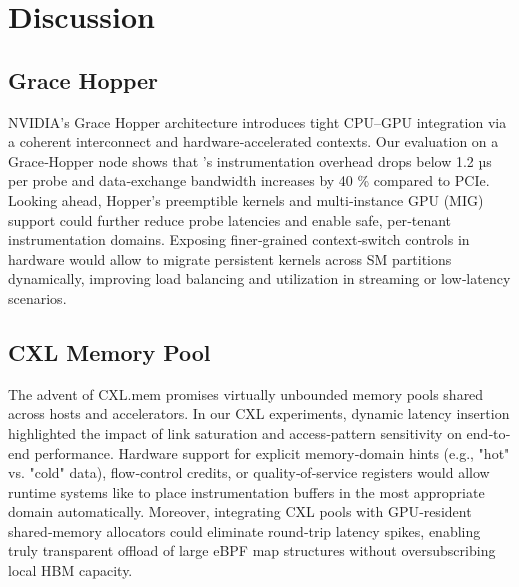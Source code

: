 \section{Discussion}\label{sec:suggestion}

\subsection{Grace Hopper}
NVIDIA's Grace Hopper architecture introduces tight CPU–GPU integration via a coherent interconnect and hardware‐accelerated contexts. Our evaluation on a Grace‐Hopper node shows that \sys{}'s instrumentation overhead drops below 1.2 µs per probe and data‐exchange bandwidth increases by 40 \% compared to PCIe. Looking ahead, Hopper's preemptible kernels and multi‐instance GPU (MIG) support could further reduce probe latencies and enable safe, per‐tenant instrumentation domains. Exposing finer‐grained context‐switch controls in hardware would allow \sys{} to migrate persistent kernels across SM partitions dynamically, improving load balancing and utilization in streaming or low‐latency scenarios.

\subsection{CXL Memory Pool}
The advent of CXL.mem promises virtually unbounded memory pools shared across hosts and accelerators. In our CXL experiments, dynamic latency insertion highlighted the impact of link saturation and access‐pattern sensitivity on end‐to‐end performance. Hardware support for explicit memory‐domain hints (e.g., "hot" vs. "cold" data), flow‐control credits, or quality‐of‐service registers would allow runtime systems like \sys{} to place instrumentation buffers in the most appropriate domain automatically. Moreover, integrating CXL pools with GPU‐resident shared‐memory allocators could eliminate round‐trip latency spikes, enabling truly transparent offload of large eBPF map structures without oversubscribing local HBM capacity.

